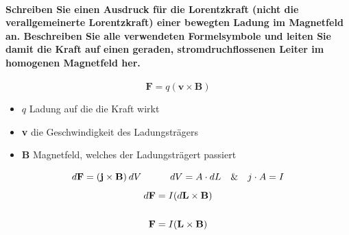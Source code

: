 \documentclass[a4paper, 11pt, ngerman, parskip=half-]{scrartcl}
\begin{document}
\paragraph{Schreiben Sie einen Ausdruck für die Lorentzkraft (nicht die verallgemeinerte
Lorentzkraft) einer bewegten Ladung im Magnetfeld an. Beschreiben Sie alle verwendeten Formelsymbole
und leiten Sie damit die Kraft auf einen geraden, stromdruchflossenen Leiter im homogenen Magnetfeld
her.}
\begin{equation}
    \textbf{F} = q(\textbf{v} \times \textbf{B})
\end{equation}
\begin{itemize}
    \item $q$ Ladung auf die die Kraft wirkt 
    \item \textbf{v} die Geschwindigkeit des Ladungsträgers
    \item \textbf{B} Magnetfeld, welches der Ladungsträgert passiert
\end{itemize}
\begin{equation}
    d\textbf{F} = (\textbf{j} \times \textbf{B})\hspace{0.2em} dV \hspace{3em} dV = A\cdot dL \hspace{1em}\& \hspace{1em} j \cdot A = I
\end{equation}
\begin{align}
    d\textbf{F} &= I (d\textbf{L} \times \textbf{B})  \\
    \notag \\ 
    \textbf{F} &= I (\textbf{L} \times \textbf{B})
\end{align}
\end{document}
